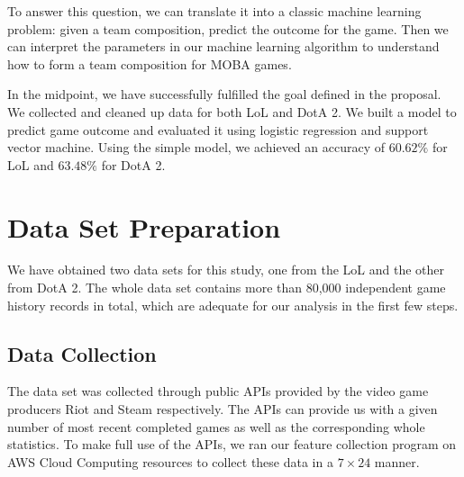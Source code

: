 \documentclass[conference]{IEEEtran}
\begin{document}
To answer this question, we can translate it into a classic machine learning problem: given a team composition, predict the outcome for the game. Then we can interpret the parameters in our machine learning algorithm to understand how to form a team composition for MOBA games.

In the midpoint, we have successfully fulfilled the goal defined in the proposal.
We collected and cleaned up data for both LoL and DotA 2.
We built a model to predict game outcome and evaluated it using logistic regression and support vector machine.
Using the simple model, we achieved an accuracy of $60.62\%$ for LoL and $63.48\%$ for DotA 2.




\section{Data Set Preparation}
We have obtained two data sets for this study, one from the LoL and the other from DotA 2. The whole data set contains more than 80,000 independent game history records in total, which are adequate for our analysis in the first few steps.

\subsection{Data Collection}

The data set was collected through public APIs provided by the video game producers Riot and Steam respectively. The APIs can provide us with a given number of most recent completed games as well as the corresponding whole statistics. To make full use of the APIs, we ran our feature collection program on AWS Cloud Computing resources to collect these data in a $7\times24$ manner.
\end{document}
